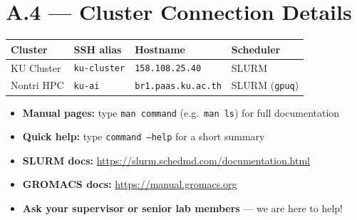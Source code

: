 \documentclass[12pt,a4paper]{article}
\begin{document}
\section*{A.4 --- Cluster Connection Details}

\begin{center}
\renewcommand{\arraystretch}{1.4}
\begin{tabular}{llll}
\toprule
\textbf{Cluster} & \textbf{SSH alias} & \textbf{Hostname} & \textbf{Scheduler} \\
\midrule
KU Cluster   & \texttt{ku-cluster} & \texttt{158.108.25.40}     & SLURM \\
Nontri HPC   & \texttt{ku-ai}      & \texttt{br1.paas.ku.ac.th} & SLURM (\texttt{gpuq}) \\
\bottomrule
\end{tabular}
\end{center}

\vspace{2em}
\begin{tcolorbox}[enhanced, colback=kugreen!8, colframe=kugreen,
    title={\bfseries Getting Help}]
  \begin{itemize}[noitemsep]
    \item \textbf{Manual pages:} type \texttt{man command} (e.g.\ \texttt{man ls}) for full documentation
    \item \textbf{Quick help:} type \texttt{command --help} for a short summary
    \item \textbf{SLURM docs:} \url{https://slurm.schedmd.com/documentation.html}
    \item \textbf{GROMACS docs:} \url{https://manual.gromacs.org}
    \item \textbf{Ask your supervisor or senior lab members} --- we are here to help!
  \end{itemize}
\end{tcolorbox}
\end{document}

